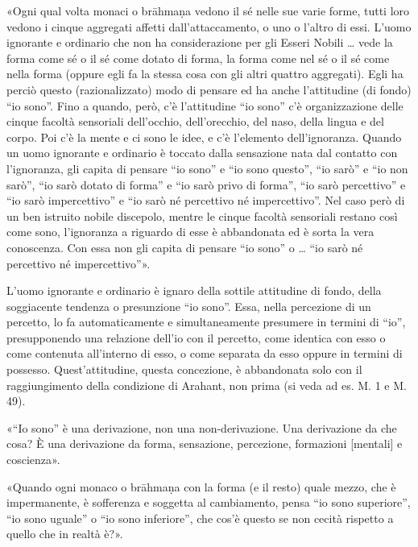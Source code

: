 
«Ogni qual volta monaci o brāhmaṇa vedono il sé nelle sue varie forme, tutti
loro vedono i cinque aggregati affetti dall’attaccamento, o uno o l’altro di
essi. L’uomo ignorante e ordinario che non ha considerazione per gli Esseri
Nobili … vede la forma come sé o il sé come dotato di forma, la forma come nel
sé o il sé come nella forma (oppure egli fa la stessa cosa con gli altri quattro
aggregati). Egli ha perciò questo (razionalizzato) modo di pensare ed ha anche
l’attitudine (di fondo) “io sono”. Fino a quando, però, c’è l’attitudine “io
sono” c’è organizzazione delle cinque facoltà sensoriali dell’occhio,
dell’orecchio, del naso, della lingua e del corpo. Poi c’è la mente e ci sono le
idee, e c’è l’elemento dell’ignoranza. Quando un uomo ignorante e ordinario è
toccato dalla sensazione nata dal contatto con l’ignoranza, gli capita di
pensare “io sono” e “io sono questo”, “io sarò” e “io non sarò”, “io sarò dotato
di forma” e “io sarò privo di forma”, “io sarò percettivo” e “io sarò
impercettivo” e “io sarò né percettivo né impercettivo”. Nel caso però di un ben
istruito nobile discepolo, mentre le cinque facoltà sensoriali restano così come
sono, l’ignoranza a riguardo di esse è abbandonata ed è sorta la vera
conoscenza. Con essa non gli capita di pensare “io sono” o … “io sarò né
percettivo né impercettivo”».


 L’uomo ignorante e ordinario è ignaro della
sottile attitudine di fondo, della soggiacente tendenza o presunzione “io sono”.
Essa, nella percezione di un percetto, lo fa automaticamente e simultaneamente
presumere in termini di “io”, presupponendo una relazione dell’io con il
percetto, come identica con esso o come contenuta all’interno di esso, o come
separata da esso oppure in termini di possesso. Quest’attitudine, questa
concezione, è abbandonata solo con il raggiungimento della condizione di
Arahant, non prima (si veda ad es. M. 1 e M. 49).

 «“Io sono” è una derivazione, non una non-derivazione. Una
derivazione da che cosa? È una derivazione da forma, sensazione, percezione,
formazioni [mentali] e coscienza».


«Quando ogni monaco o brāhmaṇa con la forma (e il resto) quale mezzo, che è
impermanente, è sofferenza e soggetta al cambiamento, pensa “io sono superiore”,
“io sono uguale” o “io sono inferiore”, che cos’è questo se non cecità rispetto
a quello che in realtà è?».

